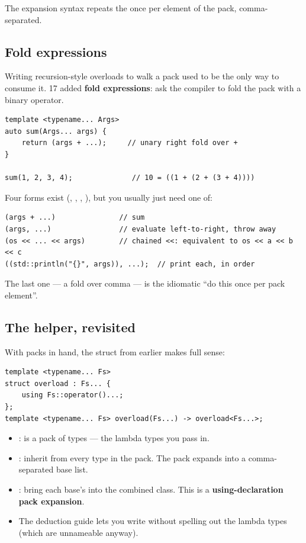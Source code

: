 The expansion syntax  repeats the 
once per element of the pack, comma-separated.

\subsection{Fold expressions}

Writing recursion-style overloads to walk a pack used to be the only
way to consume it. \cpp{}17 added \textbf{fold expressions}: ask the
compiler to fold the pack with a binary operator.

\begin{lstlisting}
template <typename... Args>
auto sum(Args... args) {
    return (args + ...);     // unary right fold over +
}

sum(1, 2, 3, 4);              // 10 = ((1 + (2 + (3 + 4))))
\end{lstlisting}

Four forms exist (,
, ,
), but you usually just need one of:

\begin{lstlisting}
(args + ...)               // sum
(args, ...)                // evaluate left-to-right, throw away
(os << ... << args)        // chained <<: equivalent to os << a << b << c
((std::println("{}", args)), ...);  // print each, in order
\end{lstlisting}

The last one --- a fold over comma --- is the idiomatic ``do this
once per pack element''.

\subsection{The  helper, revisited}

With packs in hand, the  struct from earlier makes
full sense:

\begin{lstlisting}
template <typename... Fs>
struct overload : Fs... {
    using Fs::operator()...;
};
template <typename... Fs> overload(Fs...) -> overload<Fs...>;
\end{lstlisting}

\begin{itemize}[leftmargin=*]
  \item {}:  is a pack of
    types --- the lambda types you pass in.
  \item {}: inherit from every type in
    the pack. The pack expands into a comma-separated base list.
  \item {}: bring each base's
     into the combined class. This is a
    \textbf{using-declaration pack expansion}.
  \item The deduction guide 
    lets you write  without
    spelling out the lambda types (which are unnameable anyway).
\end{itemize}

